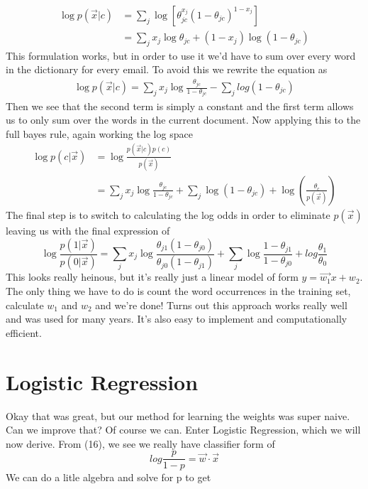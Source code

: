 \begin{align}
\log p(\vec{x} | c) &= \sum_j \log [\theta_{jc}^{x_j} (1-\theta_{jc})^{1-x_j}] \\
&=\sum_j x_j \log \theta_{jc} + (1-x_j) \log(1-\theta_{jc})
\end{align}
This formulation works, but in order to use it we'd have to sum over every word in the dictionary for every email. To avoid this we rewrite the equation as
\begin{align}
    \log p(\vec{x} | c) = \sum_j x_j \log \frac{\theta_{jc}}{1-\theta_{jc}} - \sum_j log(1-\theta_{jc})
\end{align}
Then we see that the second term is simply a constant and the first term allows us to only sum over the words in the current document. Now applying this to the full bayes rule, again working the log space
\begin{align}
\log p(c|\vec{x}) &= \log \frac{p(\vec{x}|c) p(c)}{p(\vec{x})} \\
&= \sum_j x_j \log \frac{\theta_{jc}}{1-\theta_{jc}} + \sum_j \log(1-\theta_{jc})+ \log \left (\frac{\theta_c}{p(\vec{x})} \right )
\end{align}
The final step is to switch to calculating the log odds in order to eliminate $p(\vec{x})$ leaving us with the final expression of 
\begin{equation}
    \log \frac{p(1 | \vec{x})}{p(0|\vec{x})} = \sum_j x_j \log \frac{\theta_{j1} (1-\theta_{j0})}{\theta_{j0} (1-\theta_{j1})} + \sum_j \log \frac{1 - \theta_{j1}}{1 - \theta_{j0}} + log \frac{\theta_1}{\theta_0}
\end{equation}
This looks really heinous, but it's really just a linear model of form $y=\vec{w_1} x + w_2$. The only thing we have to do is count the word occurrences in the training set, calculate $w_1$ and $w_2$ and we're done! Turns out this approach works really well and was used for many years. It's also easy to implement and computationally efficient.

\section{Logistic Regression}
Okay that was great, but our method for learning the weights was super naive. Can we improve that? Of course we can. Enter Logistic Regression, which we will now derive.  From (16), we see we really have classifier form of
\begin{equation}
    log \frac{p}{1-p} = \vec{w} \cdot \vec{x}
\end{equation}
We can do a litle algebra and solve for p to get

